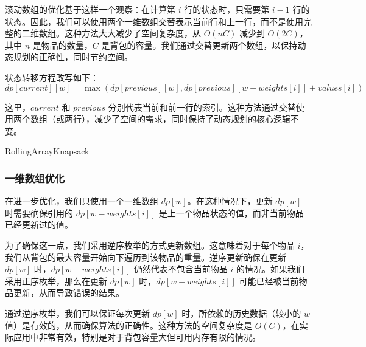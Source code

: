 \documentclass[UTF8,titlepage]{ctexart}
\numberwithin{figure}{section}
\begin{document}
滚动数组的优化基于这样一个观察：在计算第 $i$ 行的状态时，只需要第 $i-1$ 行的状态。因此，我们可以使用两个一维数组交替表示当前行和上一行，而不是使用完整的二维数组。这种方法大大减少了空间复杂度，从 \(O(nC)\) 减少到 \(O(2C)\)，其中 \(n\) 是物品的数量，\(C\) 是背包的容量。我们通过交替更新两个数组，以保持动态规划的正确性，同时节约空间。

状态转移方程改写如下：
\begin{equation}
    dp[current][w] = \max(dp[previous][w], dp[previous][w-weights[i]] + values[i])
\end{equation}

这里，$current$ 和 $previous$ 分别代表当前和前一行的索引。这种方法通过交替使用两个数组（或两行），减少了空间的需求，同时保持了动态规划的核心逻辑不变。

\begin{algorithm}[H]
    \SetAlgoLined
    \DontPrintSemicolon
    \caption{RollingArrayKnapsack}
    \end{algorithm}

\subsubsection{一维数组优化}
在进一步优化，我们只使用一个一维数组 $dp[w]$。在这种情况下，更新 $dp[w]$ 时需要确保引用的 $dp[w-weights[i]]$ 是上一个物品状态的值，而非当前物品已经更新过的值。

为了确保这一点，我们采用逆序枚举的方式更新数组。这意味着对于每个物品 $i$，我们从背包的最大容量开始向下遍历到该物品的重量。逆序更新确保在更新 $dp[w]$ 时，$dp[w-weights[i]]$ 仍然代表不包含当前物品 $i$ 的情况。如果我们采用正序枚举，那么在更新 $dp[w]$ 时，$dp[w-weights[i]]$ 可能已经被当前物品更新，从而导致错误的结果。

通过逆序枚举，我们可以保证每次更新 $dp[w]$ 时，所依赖的历史数据（较小的 $w$ 值）是有效的，从而确保算法的正确性。这种方法的空间复杂度是 \(O(C)\)，在实际应用中非常有效，特别是对于背包容量大但可用内存有限的情况。
\end{document}
